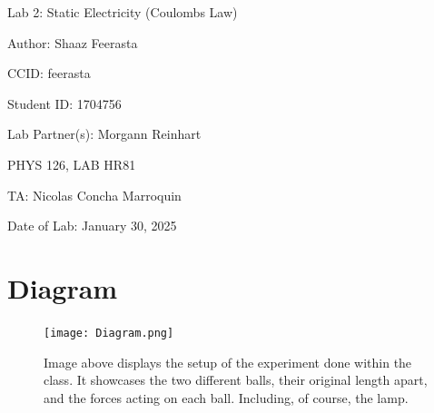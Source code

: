 \documentclass[12pt]{article}
\begin{document}
\pagebreak

\begin{titlepage}
    \begin{center}
        \vspace*{\fill}
        Lab 2: Static Electricity (Coulombs Law)

        Author: Shaaz Feerasta

        CCID: feerasta

        Student ID: 1704756

        Lab Partner(s): Morgann Reinhart

        PHYS 126, LAB HR81

        TA: Nicolas Concha Marroquin

        Date of Lab: January 30, 2025
        \vspace*{\fill}
    \end{center}
\end{titlepage}
\vfill
\pagebreak

\section{Diagram}

\begin{figure}[h]
    \centering
    \texttt{[image: Diagram.png]}
    \caption{Image above displays the setup of the experiment done within the class.
            It showcases the two different balls, their original length apart, and the forces acting on each ball.
            Including, of course, the lamp.}
    \label{fig:diagram}
\end{figure}
\end{document}
